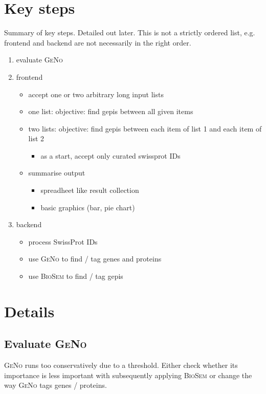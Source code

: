 \documentclass[a4paper,10pt]{article}
\begin{document}
  \section{Key steps}
  Summary of key steps. Detailed out later. This is not a strictly ordered list, e.g. frontend and backend are not necessarily in the right order.
  \begin{enumerate}
    \item evaluate \textsc{GeNo}
    \item frontend
    \begin{itemize}
      \item accept one or two arbitrary long input lists
      \item one list: objective: find gepis between all given items
      \item two lists: objective: find gepis between each item of list 1 and each item of list 2
      \begin{itemize}
	\item as a start, accept only curated swissprot IDs
      \end{itemize}
      \item summarise output
      \begin{itemize}
       \item spreadheet like result collection
       \item basic graphics (bar, pie chart)
      \end{itemize}      
    \end{itemize}
    \item backend
    \begin{itemize}
      \item process SwissProt IDs
      \item use \textsc{GeNo} to find / tag genes and proteins
      \item use \textsc{BioSem} to find / tag gepis
    \end{itemize}    
  \end{enumerate}
  
  \section{Details}
  \subsection{Evaluate \textsc{GeNo}}
  
  \textsc{GeNo} runs too conservatively due to a threshold. Either check whether its importance is less important with subsequently applying \textsc{BioSem} or change the way \textsc{GeNo} tags genes / proteins. 
  
\end{document}

